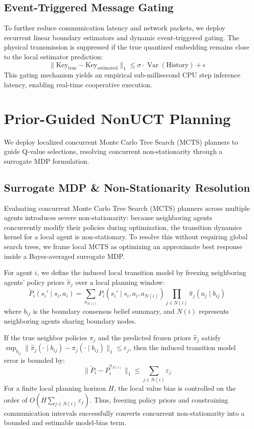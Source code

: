 \documentclass[10pt]{article}
\begin{document}
\subsection{Event-Triggered Message Gating}
To further reduce communication latency and network packets, we deploy recurrent linear boundary estimators and dynamic event-triggered gating. The physical transmission is suppressed if the true quantized embedding remains close to the local estimator prediction:
\begin{equation}
\|\text{Key}_{\text{true}} - \text{Key}_{\text{estimated}}\|_1 \le \sigma \cdot \operatorname{Var}(\text{History}) + \epsilon
\end{equation}
This gating mechanism yields an empirical sub-millisecond CPU step inference latency, enabling real-time cooperative execution.

\section{Prior-Guided NonUCT Planning}
We deploy localized concurrent Monte Carlo Tree Search (MCTS) planners \citep{silver2017alphazero} to guide Q-value selections, resolving concurrent non-stationarity through a surrogate MDP formulation.

\subsection{Surrogate MDP \& Non-Stationarity Resolution}
Evaluating concurrent Monte Carlo Tree Search (MCTS) planners across multiple agents introduces severe non-stationarity: because neighboring agents concurrently modify their policies during optimization, the transition dynamics kernel for a local agent is non-stationary. To resolve this without requiring global search trees, we frame local MCTS as optimizing an approximate best response inside a Bayes-averaged surrogate MDP. 

For agent $i$, we define the induced local transition model by freezing neighboring agents' policy priors $\hat{\pi}_j$ over a local planning window:
\begin{equation}
\tilde P_i(s_i' \mid s_i, a_i) = \sum_{a_{N(i)}} P_i(s_i' \mid s_i, a_i, a_{N(i)}) \prod_{j \in N(i)} \hat\pi_j(a_j \mid b_{ij})
\end{equation}
where $b_{ij}$ is the boundary consensus belief summary, and $N(i)$ represents neighboring agents sharing boundary nodes. 

If the true neighbor policies $\pi_j$ and the predicted frozen priors $\hat{\pi}_j$ satisfy $\sup_{b_{ij}} \|\hat\pi_j(\cdot \mid b_{ij}) - \pi_j(\cdot \mid b_{ij})\|_1 \le \varepsilon_j$, then the induced transition model error is bounded by:
\begin{equation}
\|\tilde P_i - P_i^{\pi_{N(i)}}\|_1 \le \sum_{j \in N(i)} \varepsilon_j
\end{equation}
For a finite local planning horizon $H$, the local value bias is controlled on the order of $O(H \sum_{j \in N(i)} \varepsilon_j)$. Thus, freezing policy priors and constraining communication intervals successfully converts concurrent non-stationarity into a bounded and estimable model-bias term.
\end{document}
